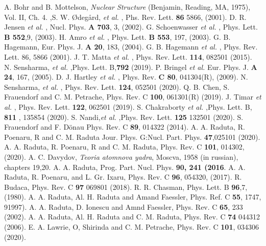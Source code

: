 \documentclass[twocolumn,article,amsmath,amssymb,floatfix,aps]{revtex4}
\begin{document}
\begin{thebibliography}{99}
A.  Bohr and B.  Mottelson, {\it Nuclear Structure} (Benjamin, Reading, MA, 1975), Vol.  II, Ch.  4. 
,S.  W.  {\O}deg{\aa}rd, {\it et al. }, Phs.  Rev.  Lett. {\bf 86} 5866, (2001). 
 D.  R.  Jensen {\it et al. }, Nucl.  Phys.  {\bf A 703}, 3, (2002). 
 G.  Schoenwasser {\it et al. }, Phys.  Lett.  {\bf B 552},9, (2003). 
 H.  Amro {\it et al. }, Phys.  Lett.  {\bf B 553}, 197, (2003). 
G.  B.  Hagemann, Eur.  Phys.  J.  {\bf A 20}, 183, (2004). 
 G.  B.  Hagemann {\it et al. }, Phys.  Rev.  Lett.  86, 5866 (2001). 
 J.  T.  Matta {\it et al. }, Phys.  Rev.  Lett.  {\bf 114}, 082501 (2015). 
N.  Sensharma, {\it et al. },Phys.  Lett.  B,{\bf 792} (2019). 
P.  Bringel {\it et al. } Eur.  Phys.  J.  {\bf A 24}, 167, (2005). 
 D.  J.  Hartley {\it et al. }, Phys.  Rev.  {\bf C 80}, 041304(R), (2009).  
N.  Sensharma, {\it et al. }, Phys.  Rev.  Lett.  {\bf 124}, 052501 (2020). 
 Q.  B.  Chen, S.  Frauendorf and C.  M.  Petrache, Phys.  Rev.  C {\bf 100}, 061301(R) (2019). 
 J.  Timar {\it et al. }, Phys.  Rev.  Lett.  {\bf 122}, 062501 (2019). 
S.  Chakraborty {\it et al. },Phys.  Lett.  B, {\bf 811} , 135854 (2020). 
 S.  Nandi,{\it et al. },Phys.  Rev.  Lett.  {\bf 125} 132501 (2020). 
 S.  Frauendorf and F.  D\"{o}nau Phys.  Rev.  C {\bf 89}, 014322 (2014). 
 A.  A. Raduta, R.   Poenaru, R and C.  M.  Raduta Jour.  Phys.  G:Nucl.  Part.  Phys. {\bf 47},025101 (2020).  
 A.  A.  Raduta, R.  Poenaru, R and C.  M.  Raduta, Phys.  Rev.  C {\bf 101}, 014302,(2020). 
 A. C.  Davydov, {\it Teoria atomnova yadra}, Moscva, 1958 (in russian), chapters 19,20. 
 A.  A.  Raduta, Prog.  Part.  Nucl.  Phys.  {\bf 90, 241 (2016}. 
 A.  A. Raduta, R.  Poenaru, and L.  Gr.  Ixaru, Phys.  Rev.  C {\bf 96}, 054320, (2017). 
 R.  Budaca, Phys.  Rev.  C {\bf 97} 069801 (2018). 
R.  R.  Chasman, Phys. Lett.  B {\bf 96},7,(1980). 
A.  A.  Raduta, Al.  H.  Raduta and Amand Faessler, Phys.  Ref.  C {\bf 55}, 1747, 91997). 
A.  A.  Raduta, D.  Ionescu and Amnd Faessler, Phys.  Rev.  C {\bf 65}, 233 (2002). 
A.  A.  Raduta, Al.  H.  Raduta and C.  M.  Raduta, Phys.  Rev.  C {\bf 74} 044312 (2006). 
 E.  A.  Lawrie, O, Shirinda and C.  M.  Petrache, Phys.  Rev.  C {\bf 101}, 034306 (2020). 
\end{thebibliography}  
\end{document}
